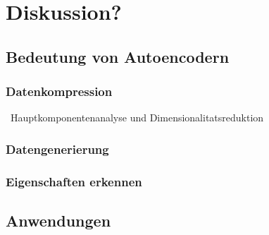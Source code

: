 \documentclass[../main]{subfiles}
\begin{document}
\section{Diskussion?}
\subsection{Bedeutung von Autoencodern}
\subsubsection{Datenkompression}
~Hauptkomponentenanalyse und Dimensionalitatsreduktion
\subsubsection{Datengenerierung}
\subsubsection{Eigenschaften erkennen}


\subsection{Anwendungen}
\end{document}
